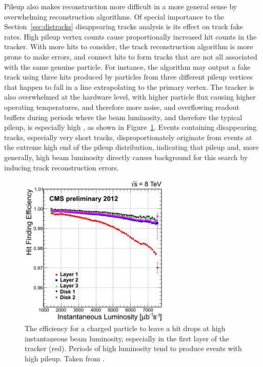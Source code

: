     Pileup also makes reconstruction more difficult in a more general sense by overwhelming reconstruction algorithms.
    Of special importance to the Section~\ref{sec:distracks} disappearing tracks analysis is its effect on track fake rates.
    High pileup vertex counts cause proportionally increased hit counts in the tracker.
    With more hits to consider, the track reconstruction algorithm is more prone to make errors, and connect hits to form tracks that are not all associated with the same genuine particle.
    For instance, the algorithm may output a fake track using three hits produced by particles from three different pileup vertices that happen to fall in a line extrapolating to the primary vertex.
    The tracker is also overwhelmed at the hardware level, with higher particle flux causing higher operating temperatures, and therefore more noise, and overflowing readout buffers during periods where the beam luminosity, and therefore the typical pileup, is especially high \cite{cms_tracker}, as shown in Figure~\ref{fig:hitefflumi}.
    Events containing disappearing tracks, especially very short tracks, disproportionately originate from events at the extreme high end of the pileup distribution, indicating that pileup and, more generally, high beam luminosity directly causes background for this search by inducing track reconstruction errors.

    \begin{figure}[h!]
      \centering
      \includegraphics[width=0.65\textwidth]{figures/HitEff_vs_InstLumi.png}
      \caption[Hit efficiency as a function of instantaneous beam luminosity.]{
        The efficiency for a charged particle to leave a hit drops at high instantaneous beam luminosity, especially in the first layer of the tracker (red).
        Periods of high luminosity tend to produce events with high pileup.
        Taken from \cite{cms_tracker}.}
      \label{fig:hitefflumi}
    \end{figure}  

